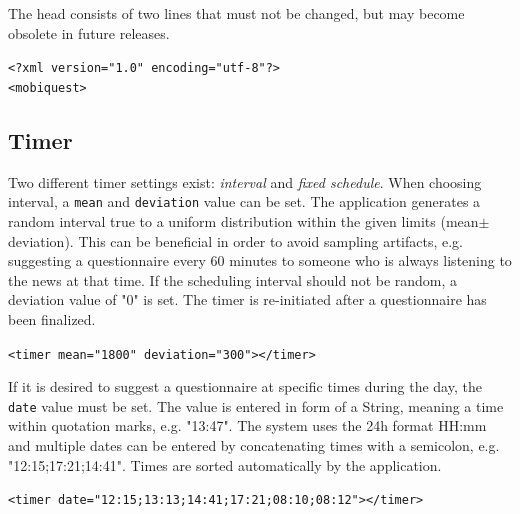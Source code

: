\documentclass[11pt,a4paper,titlepage]{article}
\begin{document}
The head consists of two lines that must not be changed, but may become obsolete in future releases.

\begin{center}
\begin{tcolorbox}[colback=black!10!white,colframe=black!50!white, boxsep=1pt,left=4pt,right=4pt,top=4pt,bottom=2pt]
\texttt{<?xml version="1.0" encoding="utf-8"?>\\
<mobiquest>}
\end{tcolorbox}
\end{center}


\subsection{Timer}

Two different timer settings exist: \textit{interval} and \textit{fixed schedule}. When choosing interval, a \texttt{mean} and \texttt{deviation} value can be set. The application generates a random interval true to a uniform distribution within the given limits (mean$\pm$deviation). This can be beneficial in order to avoid sampling artifacts, e.g. suggesting a questionnaire every 60 minutes to someone who is always listening to the news at that time. If the scheduling interval should not be random, a deviation value of "0" is set. The timer is re-initiated after a questionnaire has been finalized.

\begin{center}
\begin{tcolorbox}[colback=black!10!white,colframe=black!50!white, boxsep=1pt,left=4pt,right=4pt,top=4pt,bottom=2pt]
\texttt{<timer mean="1800" deviation="300"></timer>}
\end{tcolorbox}
\end{center}

If it is desired to suggest a questionnaire at specific times during the day, the \texttt{date} value must be set. The value is entered in form of a String, meaning a time within quotation marks, e.g. "13:47". The system uses the 24h format HH:mm and multiple dates can be entered by concatenating times with a semicolon, e.g. "12:15;17:21;14:41". Times are sorted automatically by the application. 

\begin{center}
\begin{tcolorbox}[colback=black!10!white,colframe=black!50!white, boxsep=1pt,left=4pt,right=4pt,top=4pt,bottom=2pt]
\texttt{<timer date="12:15;13:13;14:41;17:21;08:10;08:12"></timer>}
\end{tcolorbox}
\end{center}
\end{document}
